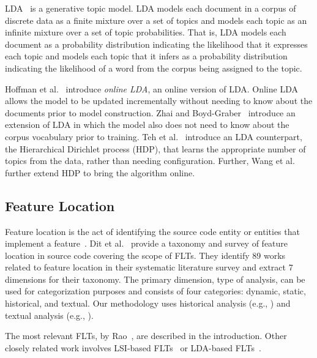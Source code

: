 LDA~\cite{Blei-etal_2003} is a generative topic model. LDA models each document
in a corpus of discrete data as a finite mixture over a set of topics and models
each topic as an infinite mixture over a set of topic probabilities. That is,
LDA models each document as a probability distribution indicating the likelihood
that it expresses each topic and models each topic that it infers as a
probability distribution indicating the likelihood of a word from the corpus
being assigned to the topic.

Hoffman et al.~\cite{Hoffman-etal_2010} introduce \textit{online LDA}, an online
version of LDA. Online LDA allows the model to be updated incrementally without
needing to know about the documents prior to model construction. Zhai and
Boyd-Graber~\cite{Zhai-Boyd-Graber_2013} introduce an extension of LDA in which
the model also does not need to know about the corpus vocabulary prior to
training. Teh et al.~\cite{Teh-etal_2006} introduce an LDA counterpart, the
Hierarchical Dirichlet process (HDP), that learns the appropriate number of
topics from the data, rather than needing configuration. Further, Wang et
al.~\cite{Wang-etal_2011} further extend HDP to bring the algorithm online.


\subsection{Feature Location}

Feature location is the act of identifying the source code entity or entities
that implement a feature~\cite{Rajlich-Wilde_2002}. Dit et
al.~\cite{Dit-etal_2013a} provide a taxonomy and survey of feature location in
source code covering the scope of FLTs. They identify 89 works related to
feature location in their systematic literature survey and extract 7 dimensions
for their taxonomy. The primary dimension, type of analysis, can be used for
categorization purposes and consists of four categories: dynamic, static,
historical, and textual. Our methodology uses historical analysis (e.g.,
\cite{Cubranic-etal_2005}) and textual analysis (e.g., \cite{Marcus-etal_2004}).

The most relevant FLTs, by Rao~\cite{Rao-etal_2013,Rao_2013}, are described in
the introduction. Other closely related work involves LSI-based
FLTs~\cite{Marcus-etal_2004,Poshyvanyk-etal_2006,Poshyvanyk-Marcus_2007,Liu-etal_2007,Scanniello-Marcus_2011,Cubranic-etal_2005}
or LDA-based
FLTs~\cite{Lukins-etal_2008,Lukins-etal_2010,Biggers-etal_2014,Bassett-Kraft_2013}.

